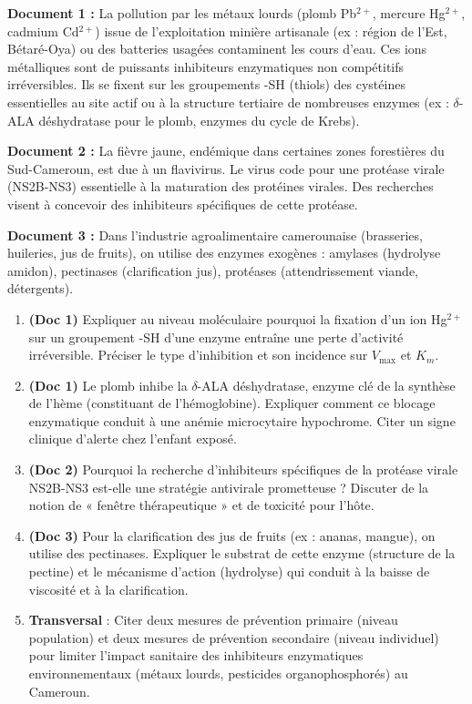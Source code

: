 \documentclass[11pt]{article}
\begin{document}
\begin{exercice}
\textbf{Document 1 :} La pollution par les métaux lourds (plomb Pb$^{2+}$, mercure Hg$^{2+}$, cadmium Cd$^{2+}$) issue de l'exploitation minière artisanale (ex : région de l'Est, Bétaré-Oya) ou des batteries usagées contaminent les cours d'eau. Ces ions métalliques sont de puissants inhibiteurs enzymatiques non compétitifs irréversibles. Ils se fixent sur les groupements -SH (thiols) des cystéines essentielles au site actif ou à la structure tertiaire de nombreuses enzymes (ex : $\delta$-ALA déshydratase pour le plomb, enzymes du cycle de Krebs).

\textbf{Document 2 :} La fièvre jaune, endémique dans certaines zones forestières du Sud-Cameroun, est due à un flavivirus. Le virus code pour une protéase virale (NS2B-NS3) essentielle à la maturation des protéines virales. Des recherches visent à concevoir des inhibiteurs spécifiques de cette protéase.

\textbf{Document 3 :} Dans l'industrie agroalimentaire camerounaise (brasseries, huileries, jus de fruits), on utilise des enzymes exogènes : amylases (hydrolyse amidon), pectinases (clarification jus), protéases (attendrissement viande, détergents).

\begin{enumerate}
    \item \textbf{(Doc 1)} Expliquer au niveau moléculaire pourquoi la fixation d'un ion Hg$^{2+}$ sur un groupement -SH d'une enzyme entraîne une perte d'activité irréversible. Préciser le type d'inhibition et son incidence sur $V_{\text{max}}$ et $K_m$.
    \item \textbf{(Doc 1)} Le plomb inhibe la $\delta$-ALA déshydratase, enzyme clé de la synthèse de l'hème (constituant de l'hémoglobine). Expliquer comment ce blocage enzymatique conduit à une anémie microcytaire hypochrome. Citer un signe clinique d'alerte chez l'enfant exposé.
    \item \textbf{(Doc 2)} Pourquoi la recherche d'inhibiteurs spécifiques de la protéase virale NS2B-NS3 est-elle une stratégie antivirale prometteuse ? Discuter de la notion de « fenêtre thérapeutique » et de toxicité pour l'hôte.
    \item \textbf{(Doc 3)} Pour la clarification des jus de fruits (ex : ananas, mangue), on utilise des pectinases. Expliquer le substrat de cette enzyme (structure de la pectine) et le mécanisme d'action (hydrolyse) qui conduit à la baisse de viscosité et à la clarification.
    \item \textbf{Transversal} : Citer deux mesures de prévention primaire (niveau population) et deux mesures de prévention secondaire (niveau individuel) pour limiter l'impact sanitaire des inhibiteurs enzymatiques environnementaux (métaux lourds, pesticides organophosphorés) au Cameroun.
\end{enumerate}
\end{exercice}
\end{document}
